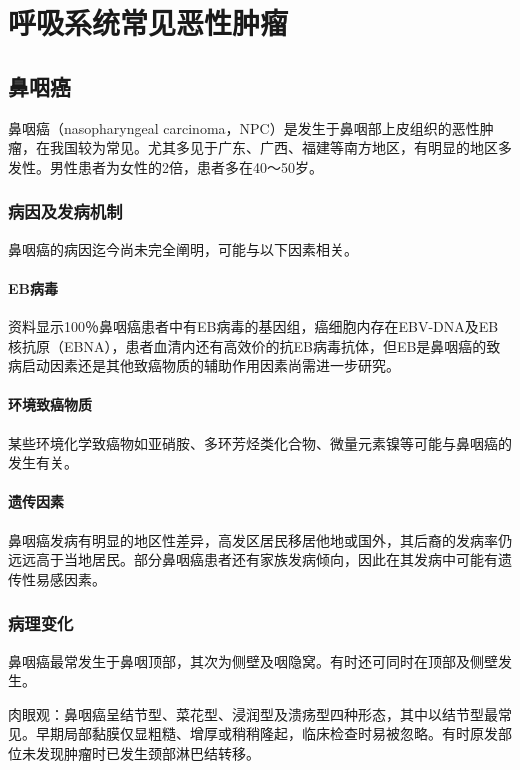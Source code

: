 \section{呼吸系统常见恶性肿瘤}

\subsection{鼻咽癌}

鼻咽癌（nasopharyngeal
carcinoma，NPC）是发生于鼻咽部上皮组织的恶性肿瘤，在我国较为常见。尤其多见于广东、广西、福建等南方地区，有明显的地区多发性。男性患者为女性的2倍，患者多在40～50岁。

\subsubsection{病因及发病机制}

鼻咽癌的病因迄今尚未完全阐明，可能与以下因素相关。

\paragraph{EB病毒}
资料显示100％鼻咽癌患者中有EB病毒的基因组，癌细胞内存在EBV-DNA及EB核抗原（EBNA），患者血清内还有高效价的抗EB病毒抗体，但EB是鼻咽癌的致病启动因素还是其他致癌物质的辅助作用因素尚需进一步研究。

\paragraph{环境致癌物质}
某些环境化学致癌物如亚硝胺、多环芳烃类化合物、微量元素镍等可能与鼻咽癌的发生有关。

\paragraph{遗传因素}
鼻咽癌发病有明显的地区性差异，高发区居民移居他地或国外，其后裔的发病率仍远远高于当地居民。部分鼻咽癌患者还有家族发病倾向，因此在其发病中可能有遗传性易感因素。

\subsubsection{病理变化}

鼻咽癌最常发生于鼻咽顶部，其次为侧壁及咽隐窝。有时还可同时在顶部及侧壁发生。

肉眼观：鼻咽癌呈结节型、菜花型、浸润型及溃疡型四种形态，其中以结节型最常见。早期局部黏膜仅显粗糙、增厚或稍稍隆起，临床检查时易被忽略。有时原发部位未发现肿瘤时已发生颈部淋巴结转移。


